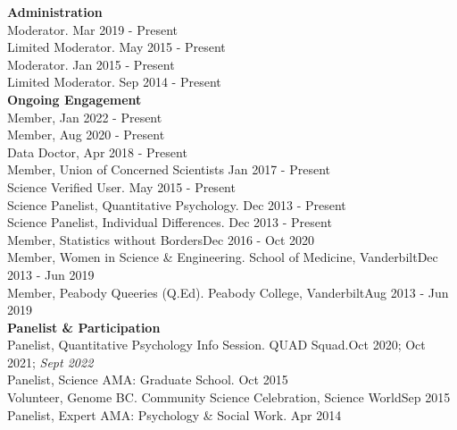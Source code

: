 {\large \textbf{Administration}}\\
Moderator. \hfill{Mar 2019 - Present}\smallskip\\
Limited Moderator. \hfill{May 2015 - Present}\smallskip\\
Moderator. \hfill{Jan 2015 - Present}\smallskip\\
Limited Moderator. \hfill{Sep 2014 - Present}\medskip\\
%
%
{\large \textbf{Ongoing Engagement}}\smallskip\\
%
Member,  \hfill{Jan 2022 - Present}\smallskip\\
Member,  \hfill{Aug 2020 - Present}\smallskip\\
Data Doctor,  \hfill{Apr 2018 - Present}\smallskip\\
Member, Union of Concerned Scientists \hfill{Jan 2017 - Present}\smallskip\\
Science Verified User. \hfill{May 2015 - Present}\smallskip\\
Science Panelist, Quantitative Psychology. \hfill{Dec 2013 - Present}\smallskip\\%
Science Panelist, Individual Differences. \hfill{Dec 2013 - Present}\smallskip\\
Member, Statistics without Borders\hfill{Dec 2016 - Oct 2020}\smallskip\\
Member, Women in Science \& Engineering. School of Medicine, Vanderbilt\hfill{Dec 2013 - Jun 2019}\smallskip\\
Member, Peabody Queeries (Q.Ed). Peabody College, Vanderbilt\hfill{Aug 2013 - Jun 2019}\medskip\\
{\large \textbf{Panelist \& Participation}}\\
Panelist, Quantitative Psychology Info Session. QUAD Squad.\hfill{Oct 2020; Oct 2021; \textit{Sept 2022}}\smallskip\\
Panelist, Science AMA: Graduate School. \hfill{Oct 2015}\smallskip\\
Volunteer, Genome BC. Community Science Celebration, Science World\hfill{Sep 2015}\smallskip\\
Panelist, Expert AMA: Psychology \& Social Work. \hfill{Apr 2014}%
